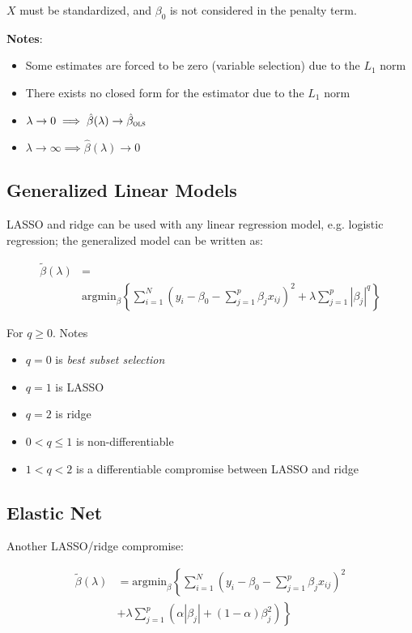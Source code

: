 \documentclass[twoside,twocolumn,10pt]{revtex4-1}
\begin{document}
	$X$ must be standardized, and $\beta_0$ is not considered in the penalty term.
	
	\textbf{Notes}:
	
	\begin{itemize}
	\item Some estimates are forced to be zero (variable selection) due to the $L_1$ norm
	\item There exists no closed form for the estimator due to the $L_1$ norm
	\item $\lambda \to 0 \implies \hat{\beta} (\lambda) \to \hat{\beta}_\textsc{ols}$
	\item $\lambda \to \infty \implies \hat{\beta} (\lambda) \to 0$
	\end{itemize}
	
	\subsection{Generalized Linear Models}
	
	LASSO and ridge can be used with any linear regression model, e.g. logistic regression; the generalized model can be written as:
	
	\begin{align*}
	\tilde{\beta} (\lambda) &= \\ &\text{argmin}_\beta \left\lbrace \sum_{i=1}^N (y_i - \beta_0 - \sum_{j=1}^p \beta_j x_{ij})^2 + \lambda \sum_{j=1}^p |\beta_j|^q \right\rbrace
	\end{align*}
	
	For $q \geq 0$.  Notes
	
	\begin{itemize}
	\item $q = 0$ is \textit{best subset selection}
	\item $q = 1$ is LASSO
	\item $q = 2$ is ridge
	\item $0 < q \leq 1$ is non-differentiable
	\item $1 < q < 2$ is a differentiable compromise between LASSO and ridge
	\end{itemize}	
	
	\subsection{Elastic Net}
	
	Another LASSO/ridge compromise:
	
	\begin{align*}
	\tilde{\beta} (\lambda) &= \text{argmin}_\beta \left\lbrace \sum_{i=1}^N (y_i - \beta_0 - \sum_{j=1}^p \beta_j x_{ij})^2 \right. \\ & \left.+ \lambda \sum_{j=1}^p (\alpha|\beta_j| + (1 - \alpha) \beta_j^2) \right\rbrace
	\end{align*}
	
\end{document}
